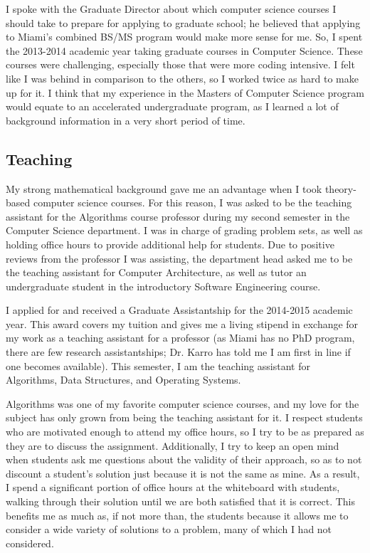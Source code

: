 \documentclass[12pt]{article}
\begin{document}
I spoke with the Graduate Director about which computer science courses I should take to prepare for applying to graduate school; 
he believed that applying to Miami's combined BS/MS program would make more sense for me. 
So, I spent the 2013-2014 academic year taking graduate courses in Computer Science. 
These courses were challenging, especially those that were more coding intensive. 
I felt like I was behind in comparison to the others, so I worked twice as hard to make up for it. 
I think that my experience in the Masters of Computer Science program would equate to an accelerated undergraduate program, as I learned a lot of background information in a very short period of time.

\subsection{Teaching}
My strong mathematical background gave me an advantage when I took theory-based computer science courses. 
For this reason, I was asked to be the teaching assistant for the Algorithms course professor during my second semester in the Computer Science department.%
I was in charge of grading problem sets, as well as holding office hours to provide additional help for students. 
Due to positive reviews from the professor I was assisting, the department head asked me to be the teaching assistant for Computer Architecture, as well as tutor an undergraduate student in the introductory Software Engineering course.

I applied for and received a Graduate Assistantship for the 2014-2015 academic year. 
This award covers my tuition and gives me a living stipend in exchange for my work as a teaching assistant for a professor (as Miami has no PhD program, there are few research assistantships; Dr. Karro has told me I am first in line if one becomes available). 
This semester, I am the teaching assistant for Algorithms, Data Structures, and Operating Systems. 

Algorithms was one of my favorite computer science courses, and my love for the subject has only grown from being the teaching assistant for it.
I respect students who are motivated enough to attend my office hours, so I try to be as prepared as they are to discuss the assignment.
Additionally, I try to keep an open mind when students ask me questions about the validity of their approach, so as to not discount a student's solution just because it is not the same as mine.
As a result, I spend a significant portion of office hours at the whiteboard with students, walking through their solution until we are both satisfied that it is correct.
This benefits me as much as, if not more than, the students because it allows me to consider a wide variety of solutions to a problem, many of which I had not considered.
\end{document}
